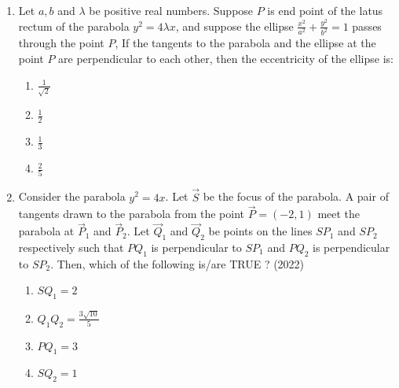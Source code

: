 \begin{enumerate}[label=\thesubsection.\arabic*.,ref=\thesubsection.\theenumi]
\item   Let $a, b$ and $\lambda$ be positive real numbers. Suppose $P$ is end point of the latus rectum of the parabola $y^2 = 4\lambda x$, and suppose the ellipse $\frac{x^2}{a^2} + \frac{y^2}{b^2} = 1$ passes through the point $P$, If the tangents to the parabola and the ellipse at the point $P$ are perpendicular to each other, then the eccentricity of the ellipse is:
     \hfill{}
\begin{multicols}{4}
    \begin{enumerate}
        \item  $\frac{1}{\sqrt{2}}$
        \item  $\frac{1}{2}$
        \item  $\frac{1}{3}$
        \item  $\frac{2}{5}$
    \end{enumerate}
\end{multicols}
 \item Consider the parabola $y^2 = 4x$. Let $\vec{S}$ be the focus of the parabola. A pair of tangents drawn to the 
parabola from the point $\vec{P} = (-2, 1)$ meet the parabola at $\vec{P}_1$ and $\vec{P}_2$. Let $\vec{Q}_1$ and $\vec{Q}_2$ be points on the 
lines $SP_1$ and $SP_2$ respectively such that $PQ_1$ is perpendicular to $SP_1$ and $PQ_2$ is perpendicular to 
$SP_2$. Then, which of the following is/are TRUE ?
	\hfill (2022)
\begin{multicols}{4}
\begin{enumerate}
 \item $SQ_1=2$
 \item $Q_1Q_2=\frac{3\sqrt{10}}{5}$
 \item $PQ_1=3$
 \item $SQ_2=1$
\end{enumerate}
\end{multicols}
\end{enumerate}

